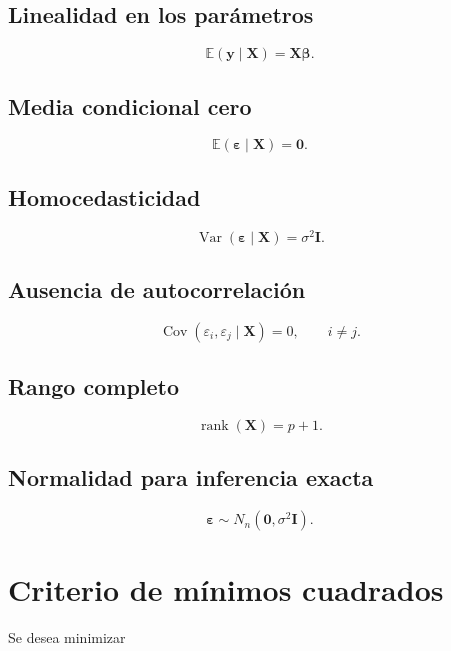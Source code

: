 \documentclass[
  spanish,
  11pt,
  letterpaper,
  DIV=11,
  numbers=noendperiod]{scrreprt}
\theoremstyle{definition}
\theoremstyle{plain}
\theoremstyle{definition}
\theoremstyle{remark}
\begin{document}
\subsection{Linealidad en los
parámetros}\label{linealidad-en-los-paruxe1metros}

\[
\mathbb{E}(\mathbf{y}\mid\mathbf{X})
=
\mathbf{X}\boldsymbol{\beta}.
\]

\subsection{Media condicional cero}\label{media-condicional-cero}

\[
\mathbb{E}(\boldsymbol{\varepsilon}\mid\mathbf{X})
=
\mathbf{0}.
\]

\subsection{Homocedasticidad}\label{homocedasticidad}

\[
\operatorname{Var}(\boldsymbol{\varepsilon}\mid\mathbf{X})
=
\sigma^2\mathbf{I}.
\]

\subsection{Ausencia de
autocorrelación}\label{ausencia-de-autocorrelaciuxf3n}

\[
\operatorname{Cov}(\varepsilon_i,\varepsilon_j\mid\mathbf{X})
=
0,
\qquad i\neq j.
\]

\subsection{Rango completo}\label{rango-completo}

\[
\operatorname{rank}(\mathbf{X})
=
p+1.
\]

\subsection{Normalidad para inferencia
exacta}\label{normalidad-para-inferencia-exacta}

\[
\boldsymbol{\varepsilon}
\sim
N_n(\mathbf{0},\sigma^2\mathbf{I}).
\]

\section{Criterio de mínimos
cuadrados}\label{criterio-de-muxednimos-cuadrados-1}

Se desea minimizar
\end{document}
